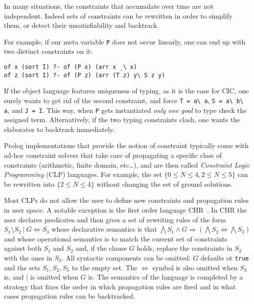 \documentclass{easychair}
\begin{document}
In many situations, the constraints that accumulate over time are
not independent.  Indeed sets of constraints can be rewritten in order to
simplify them, or detect their unsatisfiability and backtrack.

For example, if our meta variable \verb+P+ does not occur linearly, one 
can end up with two distinct constraints on it:

\begin{verbatim}
of x (sort I) ?- of (P x) (arr x _\ x)
of z (sort I) ?- of (P z) (arr (T z) y\ S z y)
\end{verbatim}

If the object language features uniqueness of typing, as it is the case
for CIC, one surely wants to get rid of the second constraint, and
force \verb+T = a\ a+, \verb+S = a\ b\ a+, and \verb+J = I+.
This way, when \verb+P+ gets instantiated \emph{only one goal}
to type check the assigned term.  Alternatively,
if the two typing constraints clash, one wants the elaborator to
backtrack immediately.

Prolog implementations that provide the notion of constraint typically come
with ad-hoc constraint solvers that take care of propagating a specific
class of constraints (arithmetic, finite domain, etc\ldots), and are
then called \emph{Constraint Logic Programming} (CLP) languages.
For example, the set $\{0 \leq N \leq 4, 2 \leq N \leq 5\}$ can be rewritten
into $\{2 \leq N \leq 4\}$ without changing the set of ground solutions.

Most CLPs do not allow the user to define new constraints and propagation
rules in user space. A notable exception is the first order language
CHR~\cite{chr}. In CHR the user declares predicates and then gives a set of
rewriting rules of the form $S_1 \setminus S_2 ~|~ G \iff S_3$ whose
declarative semantics is that $\bigwedge S_1 \wedge G \Rightarrow (\bigwedge
S_2 \iff \bigwedge S_3)$ and whose operational semantics is to match the
current set of constraints against both $S_1$ and $S_2$ and, if the clause $G$
holds, replace the constraints in $S_2$ with the ones in $S_3$. All syntactic
components can be omitted: $G$ defaults ot \verb+true+ and the sets
$S_1,S_2,S_3$ to the empty set. The $\iff$ symbol is also omitted when $S_3$
is, and $|$ is omitted when $G$ is. The semantics of the language is completed
by a strategy that fixes the order in which propagation rules are fired and in
what cases propagation rules can be backtracked.
\end{document}
